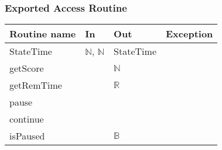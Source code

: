 \documentclass[11pt]{article}
\begin{document}
\subsubsection*{Exported Access Routine}
\label{sec:org7bba80e}
\begin{center}
\begin{tabular}{l|l|l|l}
Routine name & In & Out & Exception\\
\hline
StateTime & \(\mathbb{N}\), \(\mathbb{N}\) & StateTime & \\
getScore &  & \(\mathbb{N}\) & \\
getRemTime &  & \(\mathbb{R}\) & \\
pause &  &  & \\
continue &  &  & \\
isPaused &  & \(\mathbb{B}\) & \\
\end{tabular}
\end{center}
\end{document}
